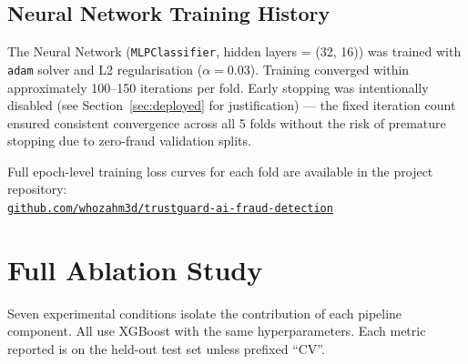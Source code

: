 \documentclass[12pt,a4paper]{article}
\begin{document}
\subsection{Neural Network Training History}

The Neural Network (\texttt{MLPClassifier}, hidden layers = (32, 16)) was trained with \texttt{adam} solver and L2 regularisation ($\alpha = 0.03$). Training converged within approximately 100--150 iterations per fold. Early stopping was intentionally disabled (see Section~\ref{sec:deployed} for justification) --- the fixed iteration count ensured consistent convergence across all 5 folds without the risk of premature stopping due to zero-fraud validation splits.

Full epoch-level training loss curves for each fold are available in the project repository:\\
\href{https://github.com/whozahm3d/trustguard-ai-fraud-detection}{\texttt{github.com/whozahm3d/trustguard-ai-fraud-detection}}

\section{Full Ablation Study}

\label{sec:ablation}

Seven experimental conditions isolate the contribution of each pipeline component. All use XGBoost with the same hyperparameters. Each metric reported is on the held-out test set unless prefixed ``CV''.
\end{document}
